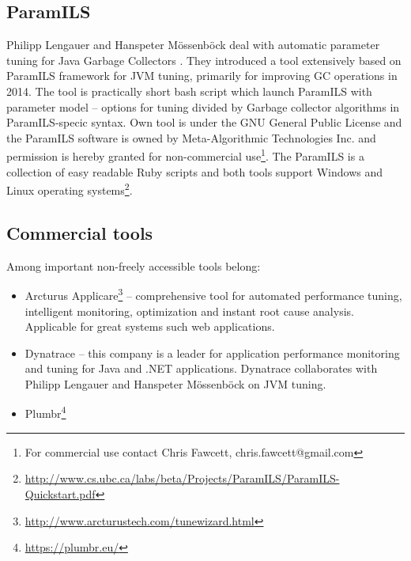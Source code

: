 \documentclass[
  digital, %
  oneside,
  notable, %
  nolof,     %
  nolot     %
]{fithesis3}
\begin{document}
\subsection{ParamILS}
Philipp Lengauer and Hanspeter Mössenböck deal with automatic parameter tuning for Java Garbage Collectors \cite{jvmtuner}. They introduced a tool extensively based on ParamILS framework for JVM tuning, primarily for improving GC operations in 2014. The tool is practically short bash script which launch ParamILS with parameter model -- options for tuning divided by Garbage collector algorithms in ParamILS-specic syntax. Own tool is under the GNU General Public License and the ParamILS software is owned by Meta-Algorithmic Technologies Inc. and permission is hereby granted for non-commercial use\footnote{For commercial use contact Chris Fawcett, chris.fawcett@gmail.com}. \cite{jvmtuner} \cite{paramils} The ParamILS is a collection of easy readable Ruby scripts and both tools support Windows and Linux operating systems\footnote{\url{http://www.cs.ubc.ca/labs/beta/Projects/ParamILS/ParamILS-Quickstart.pdf}}. 



\subsection{Commercial tools}
Among important non-freely accessible tools belong:
\begin{itemize}
	\item Arcturus Applicare\footnote{\url{http://www.arcturustech.com/tunewizard.html}} -- comprehensive tool for automated performance tuning, intelligent monitoring, optimization and instant root cause analysis. Applicable for great systems such web applications.
	\item Dynatrace -- this company is a leader for application performance monitoring and tuning for Java and .NET applications. Dynatrace collaborates with Philipp Lengauer and Hanspeter Mössenböck on JVM tuning. \cite{jvmtuner-boost}
	\item Plumbr\footnote{\url{https://plumbr.eu/}}
\end{itemize}
\end{document}
